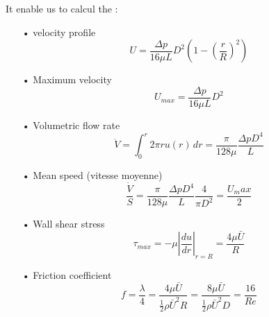 		It enable us to calcul the :
		\begin{itemize}
			\item[•] velocity profile
			\begin{equation}
				U = \frac{\Delta p}{16\mu L}D^2 \left(1-\left(\frac{r}{R}\right)^2 \right)
			\end{equation}
			
			\item[•] Maximum velocity 
			\begin{equation}
				U_{max} = \frac{\Delta p}{16 \mu L }D^2
			\end{equation}
			
			\item[•] Volumetric flow rate
			\begin{equation}
				\dot{V} = \int _0 ^r 2\pi r u(r) \, dr = \frac{\pi}{128 \mu} \frac{\Delta p D^4}{L}
			\end{equation}
			
			\item[•] Mean speed (vitesse moyenne)
			\begin{equation}
				\frac{\dot{V}}{S} = \frac{\pi}{128 \mu} \frac{\Delta p D^4}{L} \frac{4}{\pi D^2} = \frac{U_max}{2}
			\end{equation}
			
			\item[•] Wall shear stress
			\begin{equation}
				\tau _{max} = -\mu |\frac{du}{dr}| _{r=R} = \frac{4 \mu \bar{U}}{R}
			\end{equation}
			
			\item[•] Friction coefficient
			\begin{equation}
				f = \frac{\lambda}{4} = \frac{4 \mu \bar{U}}{\frac{1}{2}\rho \bar{U}^2 R} = \frac{8 \mu \bar{U}}{\frac{1}{2}\rho \bar{U}^2 D} = \frac{16}{Re}
			\end{equation}
		\end{itemize}
		
